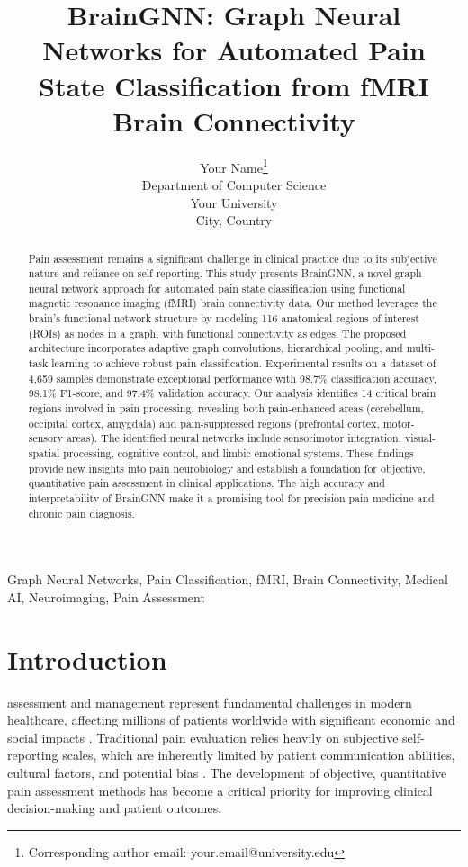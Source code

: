 \documentclass[10pt,journal,compsoc]{IEEEtran}
\title{BrainGNN: Graph Neural Networks for Automated Pain State Classification from fMRI Brain Connectivity}
\author{
    Your Name\thanks{Corresponding author email: your.email@university.edu}\\
    Department of Computer Science\\
    Your University\\
    City, Country
}
\begin{document}
\maketitle

\begin{abstract}
Pain assessment remains a significant challenge in clinical practice due to its subjective nature and reliance on self-reporting. This study presents BrainGNN, a novel graph neural network approach for automated pain state classification using functional magnetic resonance imaging (fMRI) brain connectivity data. Our method leverages the brain's functional network structure by modeling 116 anatomical regions of interest (ROIs) as nodes in a graph, with functional connectivity as edges. The proposed architecture incorporates adaptive graph convolutions, hierarchical pooling, and multi-task learning to achieve robust pain classification. Experimental results on a dataset of 4,659 samples demonstrate exceptional performance with 98.7\% classification accuracy, 98.1\% F1-score, and 97.4\% validation accuracy. Our analysis identifies 14 critical brain regions involved in pain processing, revealing both pain-enhanced areas (cerebellum, occipital cortex, amygdala) and pain-suppressed regions (prefrontal cortex, motor-sensory areas). The identified neural networks include sensorimotor integration, visual-spatial processing, cognitive control, and limbic emotional systems. These findings provide new insights into pain neurobiology and establish a foundation for objective, quantitative pain assessment in clinical applications. The high accuracy and interpretability of BrainGNN make it a promising tool for precision pain medicine and chronic pain diagnosis.
\end{abstract}

\begin{IEEEkeywords}
Graph Neural Networks, Pain Classification, fMRI, Brain Connectivity, Medical AI, Neuroimaging, Pain Assessment
\end{IEEEkeywords}

\section{Introduction}

 assessment and management represent fundamental challenges in modern healthcare, affecting millions of patients worldwide with significant economic and social impacts \cite{pain_burden_2023}. Traditional pain evaluation relies heavily on subjective self-reporting scales, which are inherently limited by patient communication abilities, cultural factors, and potential bias \cite{subjective_pain_2022}. The development of objective, quantitative pain assessment methods has become a critical priority for improving clinical decision-making and patient outcomes.
\end{document}
